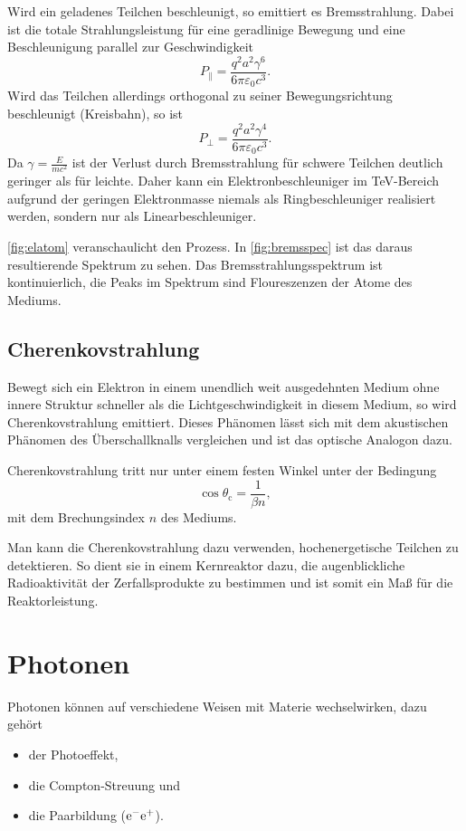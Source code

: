 Wird ein geladenes Teilchen beschleunigt, so emittiert es Bremsstrahlung.
Dabei ist die totale Strahlungsleistung für eine geradlinige Bewegung und eine Beschleunigung parallel zur Geschwindigkeit
\begin{equation*}
	P_\parallel = \frac{q^2a^2\gamma^6}{6\pi\varepsilon_0c^3}.
\end{equation*}
Wird das Teilchen allerdings orthogonal zu seiner Bewegungsrichtung beschleunigt (Kreisbahn), so ist
\begin{equation*}
	P_\perp = \frac{q^2a^2\gamma^4}{6\pi\varepsilon_0c^3}.
\end{equation*}
Da $\gamma = \frac{E}{mc^2}$ ist der Verlust durch Bremsstrahlung für schwere Teilchen deutlich geringer als für leichte.
Daher kann ein Elektronbeschleuniger im \si{\TeV}-Bereich aufgrund der geringen Elektronmasse niemals als Ringbeschleuniger realisiert werden, sondern nur als Linearbeschleuniger.

\autoref{fig:elatom} veranschaulicht den Prozess. In \autoref{fig:bremsspec} ist das daraus resultierende Spektrum zu sehen.
Das Bremsstrahlungsspektrum ist kontinuierlich, die Peaks im Spektrum sind Floureszenzen der Atome des Mediums.

\subsection{Cherenkovstrahlung}
Bewegt sich ein Elektron in einem unendlich weit ausgedehnten Medium ohne innere Struktur schneller als die Lichtgeschwindigkeit in diesem Medium, so wird Cherenkovstrahlung emittiert.
Dieses Phänomen lässt sich mit dem akustischen Phänomen des Überschallknalls vergleichen und ist das optische Analogon dazu.

Cherenkovstrahlung tritt nur unter einem festen Winkel unter der Bedingung
\begin{equation*}
	\cos\theta_\text{c} = \frac{1}{\beta n},
\end{equation*}
mit dem Brechungsindex $n$ des Mediums.

Man kann die Cherenkovstrahlung dazu verwenden, hochenergetische Teilchen zu detektieren.
So dient sie in einem Kernreaktor dazu, die augenblickliche Radioaktivität der Zerfallsprodukte zu bestimmen und ist somit ein Maß für die Reaktorleistung.

\section{Photonen}
Photonen können auf verschiedene Weisen mit Materie wechselwirken, dazu gehört
\begin{itemize}
	\item der Photoeffekt,
	\item die Compton-Streuung und
	\item die Paarbildung ($\text{e}^-\text{e}^+$).
\end{itemize}

